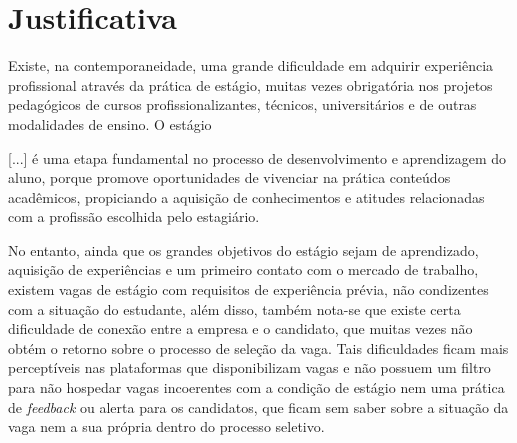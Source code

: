 \section{Justificativa} \label{justificativa}
Existe, na contemporaneidade, uma grande dificuldade em adquirir experiência profissional através da prática de estágio, muitas vezes obrigatória nos projetos pedagógicos de cursos profissionalizantes, técnicos, universitários e de outras modalidades de ensino. O estágio
\begin{quoting}[rightmargin=0cm,leftmargin=4cm]
	\begin{SingleSpace}
		{\footnotesize
		[...] é uma etapa fundamental no processo de desenvolvimento e aprendizagem do aluno, porque promove oportunidades de vivenciar na prática conteúdos acadêmicos, propiciando a aquisição de conhecimentos e atitudes relacionadas com a profissão escolhida pelo estagiário. \cite{ciee}
		}
	\end{SingleSpace}
\end{quoting}

No entanto, ainda que os grandes objetivos do estágio sejam de aprendizado, aquisição de experiências e um primeiro contato com o mercado de trabalho, existem vagas de estágio com requisitos de experiência prévia, não condizentes com a situação do estudante, além disso, também nota-se que existe certa dificuldade de conexão entre a empresa e o candidato, que muitas vezes não obtém o retorno sobre o processo de seleção da vaga.
Tais dificuldades ficam mais perceptíveis nas plataformas que disponibilizam vagas e não possuem um filtro para não hospedar vagas incoerentes com a condição de estágio nem uma prática de \textit{feedback} ou alerta para os candidatos, que ficam sem saber sobre a situação da vaga nem a sua própria dentro do processo seletivo.